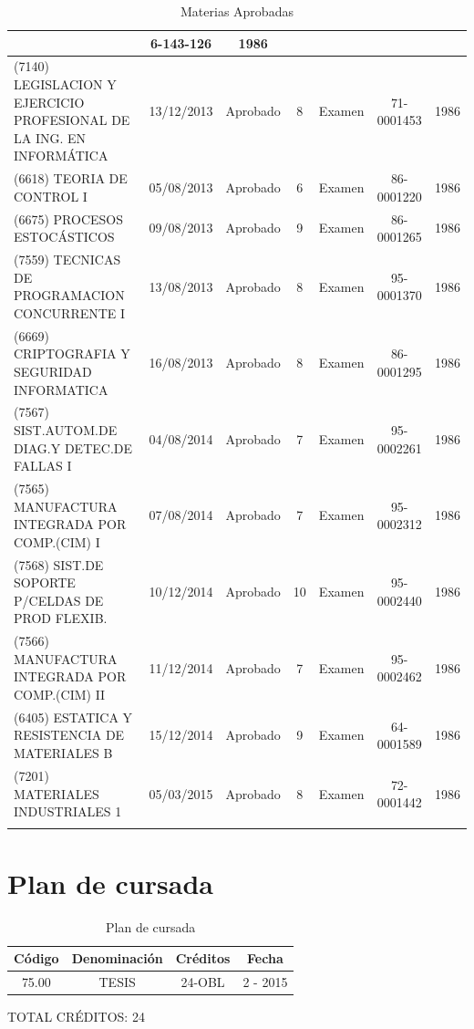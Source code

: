 \documentclass[a4paper,10pt]{article}
\begin{document}
\begin{center}
\begin{longtable}{|p{3.5cm}|c|c|c|p{1.4cm}|c|c|}
			& 6-143-126 & 1986 \\
			\hline
			(7140) LEGISLACION Y EJERCICIO PROFESIONAL DE LA ING. EN INFORMÁTICA
			& 13/12/2013 & Aprobado & 8 & Examen & 71-0001453 & 1986 \\
			\hline
			(6618) TEORIA DE CONTROL I & 05/08/2013 & Aprobado & 6 & Examen & 
			86-0001220 & 1986 \\
			\hline
			(6675) PROCESOS ESTOCÁSTICOS & 09/08/2013 & Aprobado & 9 & Examen & 
			86-0001265 & 1986 \\
			\hline
			(7559) TECNICAS DE PROGRAMACION CONCURRENTE I & 13/08/2013 & 
			Aprobado & 8 & Examen & 95-0001370 & 1986 \\
			\hline
			(6669) CRIPTOGRAFIA Y SEGURIDAD INFORMATICA & 16/08/2013 & Aprobado
			& 8 & Examen & 86-0001295 & 1986 \\
			\hline
			(7567) SIST.AUTOM.DE DIAG.Y DETEC.DE FALLAS I & 04/08/2014 & 
			Aprobado & 7 & Examen & 95-0002261 & 1986 \\
			\hline
			(7565) MANUFACTURA INTEGRADA POR COMP.(CIM) I & 07/08/2014 & 
			Aprobado & 7 & Examen & 95-0002312 & 1986 \\
			\hline
			(7568) SIST.DE SOPORTE P/CELDAS DE PROD FLEXIB. & 10/12/2014 & 
			Aprobado & 10 & Examen & 95-0002440 & 1986 \\
			\hline
			(7566) MANUFACTURA INTEGRADA POR COMP.(CIM) II & 11/12/2014 & 
			Aprobado & 7 & Examen & 95-0002462 & 1986 \\
			\hline
			(6405) ESTATICA Y RESISTENCIA DE MATERIALES B & 15/12/2014 & 
			Aprobado & 9 & Examen & 64-0001589 & 1986 \\
			\hline
			(7201) MATERIALES INDUSTRIALES 1 & 05/03/2015 & 
			Aprobado & 8 & Examen & 72-0001442 & 1986 \\
			\hline
			\caption{Materias Aprobadas} \label{tab:matApr}
		\end{longtable}
	\end{center}
	
    \newpage
	\section{Plan de cursada}
	
	\begin{table}[!htb]
		\centering
		\begin{tabular}{|c|c|c|c|}
			\hline
			Código & Denominación & Créditos & Fecha \\
			\hline
			75.00 & TESIS & 24-OBL & 2 - 2015 \\
			\hline
		\end{tabular}
		\caption{Plan de cursada} \label{tabPlanCursada}
	\end{table}

	TOTAL CRÉDITOS: 24	
\end{document}
